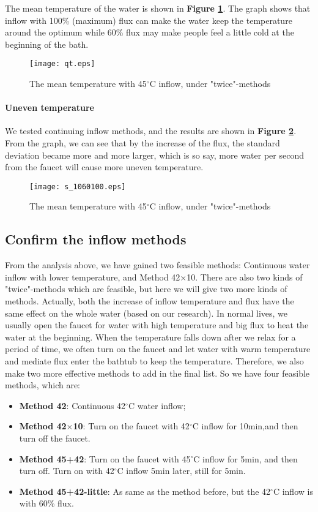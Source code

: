 \documentclass{HZNUMCM}
\begin{document}
The mean temperature of the water is shown in \textbf{Figure \ref{qt}}. The graph shows that inflow
with 100\% (maximum) flux can make the water keep the temperature around the optimum while 60\% flux
may make people feel a little cold at the beginning of the bath.
\begin{figure}[!htbp]
\small
\centering
\texttt{[image: qt.eps]}
\caption{The mean temperature with 45$^\circ$C inflow, under "twice"-methods}\label{qt}
\end{figure}

\paragraph{Uneven temperature}
We tested continuing inflow methods, and the results are shown in \textbf{Figure \ref{s3}}. From the
graph, we can see that by the increase of the flux, the standard deviation became more and more
larger, which is so say, more water per second from the faucet will cause more uneven temperature.
\begin{figure}[!htbp]
    \small
    \centering
    \texttt{[image: s\_1060100.eps]}
    \caption{The mean temperature with 45$^\circ$C inflow, under "twice"-methods}\label{s3}
\end{figure}

\subsection{Confirm the inflow methods}
From the analysis above, we have gained two feasible methods: Continuous water inflow with lower
temperature, and Method 42$\times$10. There are also two kinds of "twice"-methods which are
feasible, but here we will give two more kinds of methods. Actually, both the increase of inflow
temperature and flux have the same effect on the whole water (based on our research). In normal
lives, we usually open the faucet for water with high temperature and big flux to heat the water at
the beginning. When the temperature falls down after we relax for a period of time, we often turn on
the faucet and let water with warm temperature and mediate flux enter the bathtub to keep the
temperature. Therefore, we also make two more effective methods to add in the final list. So we have
four feasible methods, which are:
\begin{itemize}
    \item \textbf{Method 42}: Continuous 42$^\circ$C water inflow;
    \item \textbf{Method 42$\times$10}: Turn on the faucet with 42$^\circ$C inflow for 10min,and
    then turn off the faucet.
    \item \textbf{Method 45+42}: Turn on the faucet with 45$^\circ$C inflow for 5min, and then turn
    off. Turn on with 42$^\circ$C inflow 5min later, still for 5min.
    \item \textbf{Method 45+42-little}: As same as the method before, but the 42$^\circ$C inflow is
    with 60\% flux.
\end{itemize}
\end{document}
